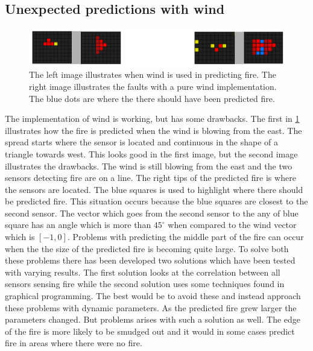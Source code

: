 \subsection{Unexpected predictions with wind}
\begin{figure}[here]
  \centering
      \includegraphics[width=1.0\textwidth]{solution/graphics/wind-problem.png}
  \caption{The left image illustrates when wind is used in predicting fire. The right image illustrates the faults with a pure wind implementation. The blue dots are where the there should have been predicted fire.}
  \label{fig:wind-problem}
\end{figure}

The implementation of wind is working, but has some drawbacks. The first in \ref{fig:wind-problem} illustrates how the fire is predicted when the wind is blowing from the east. The spread starts where the sensor is located and continuous in the shape of a triangle towards west. This looks good in the first image, but the second image illustrates the drawbacks. The wind is still blowing from the east and the two sensors detecting fire are on a line. The right tips of the predicted fire is where the sensors are located. The blue squares is used to highlight where there should be predicted fire. This situation occurs because the blue squares are closest to the second sensor. The vector which goes from the second sensor to the any of blue square has an angle which is more than $ 45^{\circ} $ when compared to the wind vector which is $ \left[-1,0\right] $. Problems with predicting the middle part of the fire can occur when the the size of the predicted fire is becoming quite large. To solve both these problems there has been developed two solutions which have been tested with varying results. The first solution looks at the correlation between all sensors sensing fire while the second solution uses some techniques found in graphical programming. The best would be to avoid these and instead approach these problems with dynamic parameters. As the predicted fire grew larger the parameters changed. But problems arises with such a solution as well. The edge of the fire is more likely to be smudged out and it would in some cases predict fire in areas where there were no fire.
